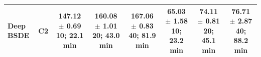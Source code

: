 \begin{table}[t]
\begin{tabular}{llcccccc}
Deep BSDE & C2 & \shortstack{147.12 $\pm$ 0.69\\10; 22.1 min} & \shortstack{160.08 $\pm$ 1.01\\20; 43.0 min} & \shortstack{167.06 $\pm$ 0.83\\40; 81.9 min} & \shortstack{65.03 $\pm$ 1.58\\10; 23.2 min} & \shortstack{74.11 $\pm$ 0.81\\20; 45.1 min} & \shortstack{76.71 $\pm$ 2.87\\40; 88.2 min} \\
\bottomrule
\end{tabular}
\end{table}
